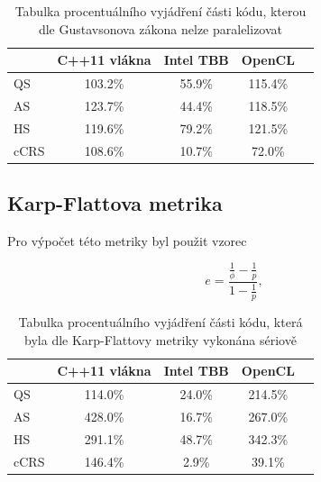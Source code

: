 \documentclass[]{thesiskiv}
\begin{document}
\begin{table}[ht]
\begin{center}
	\begin{tabular}{ | l | c | c | c | c | }
		\hline
    	~ & C++11 vlákna & Intel TBB & OpenCL \\
		\hline
		\hline
		QS & {\color{Red} 103.2\%} & {\color{OliveGreen} 55.9\%} & {\color{Red} 115.4\%} \\ \hline
		AS & {\color{Red} 123.7\%} & {\color{OliveGreen} 44.4\%} & {\color{Red} 118.5\%} \\ \hline
		HS & {\color{Red} 119.6\%} & {\color{OliveGreen} 79.2\%} & {\color{Red} 121.5\%} \\ \hline
		cCRS & {\color{Red} 108.6\%} & {\color{OliveGreen} 10.7\%} & {\color{OliveGreen} 72.0\%} \\
		\hline
  \end{tabular}
  \caption{Tabulka procentuálního vyjádření části kódu, kterou dle Gustavsonova zákona nelze paralelizovat}
  \end{center}
\end{table}

\subsection{Karp-Flattova metrika}

Pro výpočet této metriky byl použit vzorec 

\begin{equation}
	e = \frac{\frac{1}{\phi} - \frac{1}{p}}{1 - \frac{1}{p}},
\end{equation}

\begin{table}[ht]
\begin{center}
	\begin{tabular}{ | l | c | c | c | c | }
		\hline
    	~ & C++11 vlákna & Intel TBB & OpenCL \\
		\hline
		\hline
		QS & {\color{Red} 114.0\%} & {\color{OliveGreen} 24.0\%} & {\color{Red} 214.5\%} \\ \hline
		AS & {\color{Red} 428.0\%} & {\color{OliveGreen} 16.7\%} & {\color{Red} 267.0\%} \\ \hline
		HS & {\color{Red} 291.1\%} & {\color{OliveGreen} 48.7\%} & {\color{Red} 342.3\%} \\ \hline
		cCRS & {\color{Red} 146.4\%} & {\color{OliveGreen} 2.9\%} & {\color{OliveGreen} 39.1\%} \\
		\hline
  \end{tabular}
  \caption{Tabulka procentuálního vyjádření části kódu, která byla dle Karp-Flattovy metriky vykonána sériově}
  \end{center}
\end{table}
\end{document}
